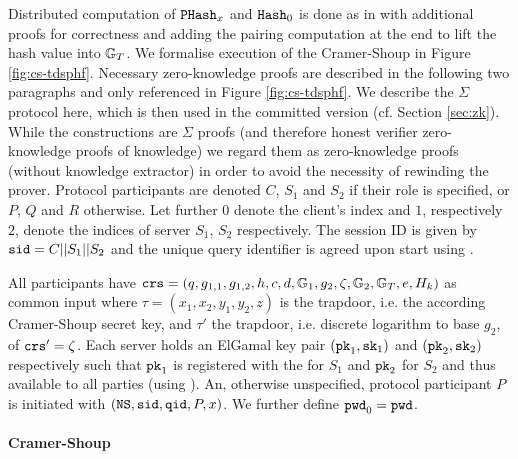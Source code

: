 \noindent
Distributed computation of $\mathtt{PHash}_x$ and $\mathtt{Hash}_0$ is done as in \DSPHF with additional proofs for correctness and adding the pairing computation at the end to lift the hash value into $\mathbb{G}_T$.
We formalise execution of the Cramer-Shoup \TDSPHF in Figure \ref{fig:cs-tdsphf}.
Necessary zero-knowledge proofs are described in the following two paragraphs and only referenced in Figure \ref{fig:cs-tdsphf}.
We describe the $\Sigma$ protocol here, which is then used in the committed version (cf. Section \ref{sec:zk}).
While the constructions are $\Sigma$ proofs (and therefore honest verifier zero-knowledge proofs of knowledge) we regard them as zero-knowledge proofs (without knowledge extractor) in order to avoid the necessity of rewinding the prover.
Protocol participants are denoted $C$, $S_1$ and $S_2$ if their role is specified, or $P$, $Q$ and $R$ otherwise.
Let further $0$ denote the client's index and $1$, respectively $2$, denote the indices of server $S_1$, $S_2$ respectively.
The session ID is given by $\mathtt{sid}=C||S_1||S_2$ and the unique query identifier \qid is agreed upon start using \Finit.

All \TDSPHF participants have $\mathtt{crs}=(q,g_{1,1},g_{1,2},h,c,d,\mathbb{G}_1,g_{2},\zeta,\mathbb{G}_2,\mathbb{G}_T,e,H_k)$ as common input where $\tau=(x_1,x_2,y_1,y_2,z)$ is the \crs trapdoor, i.e. the according Cramer-Shoup secret key, and $\tau'$ the trapdoor, i.e. discrete logarithm to base $g_2$, of $\mathtt{crs}'=\zeta$.
Each server holds an ElGamal key pair $(\mathtt{pk}_1, \mathtt{sk}_1)$ and $(\mathtt{pk}_2, \mathtt{sk}_2)$ respectively such that $\mathtt{pk}_1$ is registered with the \CA for $S_1$ and $\mathtt{pk}_2$ for $S_2$ and thus available to all parties (using \Fca).
An, otherwise unspecified, protocol participant $P$ is initiated with $(\mathtt{NS}, \mathtt{sid}, \mathtt{qid}, P, x)$.
We further define $\mathtt{pwd}_0=\mathtt{pwd}$.

\paragraph{Cramer-Shoup \TDSPHF}

